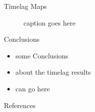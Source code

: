 \documentclass[final]{beamer}
\begin{document}
\begin{frame}
\begin{columns}[T]
\begin{column}{0.49\linewidth}
    \begin{block}{Timelag Maps}
        \begin{figure}
            \caption{caption goes here}
            \label{fig:timelags}
        \end{figure}
    \end{block}
    \begin{block}{Conclusions}
      \begin{itemize}
        \item some Conclusions
        \item about the timelag results
        \item can go here
      \end{itemize}
    \end{block}
    \begin{block}{References}
      \scriptsize
      \begin{multicols}{2}
        
        
      \end{multicols}
    \end{block}
  \end{column}
  \end{columns}
\end{frame}
\end{document}
